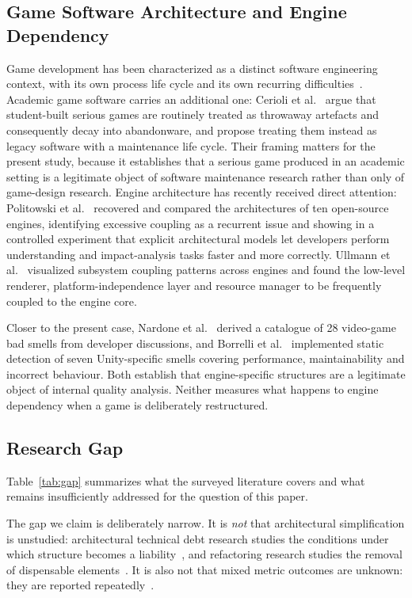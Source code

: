 \documentclass{sbc2019}%
\begin{document}
\subsection{Game Software Architecture and Engine Dependency}

Game development has been characterized as a distinct software engineering
context, with its own process life cycle and its own recurring difficulties~\cite{aleem2016}.
Academic game software carries an additional one: Cerioli et
al.\ \cite{cerioli2026} argue that student-built serious games are routinely
treated as throwaway artefacts and consequently decay into abandonware, and
propose treating them instead as legacy software with a maintenance life cycle.
Their framing matters for the present study, because it establishes that a serious
game produced in an academic setting is a legitimate object of software
maintenance research rather than only of game-design research. Engine architecture has recently received direct attention:
Politowski et al.\ \cite{politowski2025} recovered and compared the
architectures of ten open-source engines, identifying excessive coupling as a
recurrent issue and showing in a controlled experiment that explicit
architectural models let developers perform understanding and impact-analysis
tasks faster and more correctly. Ullmann et al.\ \cite{ullmann2023} visualized
subsystem coupling patterns across engines and found the low-level renderer,
platform-independence layer and resource manager to be frequently coupled to
the engine core.

Closer to the present case, Nardone et al.\ \cite{nardone2023} derived a
catalogue of 28 video-game bad smells from developer discussions, and Borrelli
et al.\ \cite{borrelli2020} implemented static detection of seven Unity-specific
smells covering performance, maintainability and incorrect behaviour. Both
establish that engine-specific structures are a legitimate object of internal
quality analysis. Neither measures what happens to engine dependency when a
game is deliberately restructured.

\subsection{Research Gap}\label{sec:gap}

Table~\ref{tab:gap} summarizes what the surveyed literature covers and what
remains insufficiently addressed for the question of this paper.

The gap we claim is deliberately narrow. It is \emph{not} that architectural
simplification is unstudied: architectural technical debt research studies the
conditions under which structure becomes a liability~\cite{verdecchia2020,verdecchia2021,li2022},
and refactoring research studies
the removal of dispensable elements~\cite{fowler2018,romano2020}. It is also
not that mixed metric outcomes are unknown: they are reported
repeatedly~\cite{szoke2017,bavota2015,palomba2018}.
\end{document}
